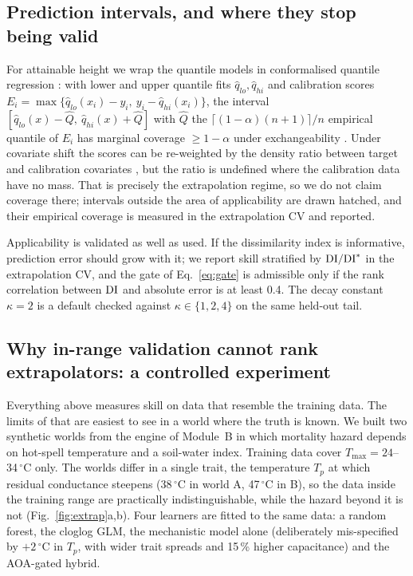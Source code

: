 \subsection{Prediction intervals, and where they stop being valid}
For attainable height we wrap the quantile models in conformalised quantile regression \citep{Romano2019}: with lower and upper quantile fits $\hat q_{lo},\hat q_{hi}$ and calibration scores $E_i=\max\{\hat q_{lo}(x_i)-y_i,\ y_i-\hat q_{hi}(x_i)\}$, the interval $[\hat q_{lo}(x)-\hat Q,\ \hat q_{hi}(x)+\hat Q]$ with $\hat Q$ the $\lceil(1-\alpha)(n+1)\rceil/n$ empirical quantile of $E_i$ has marginal coverage $\ge1-\alpha$ under exchangeability \citep{Angelopoulos2023}. Under covariate shift the scores can be re-weighted by the density ratio between target and calibration covariates \citep{Tibshirani2019}, but the ratio is undefined where the calibration data have no mass. That is precisely the extrapolation regime, so we do not claim coverage there; intervals outside the area of applicability are drawn hatched, and their empirical coverage is measured in the extrapolation CV and reported.

Applicability is validated as well as used. If the dissimilarity index is informative, prediction error should grow with it; we report skill stratified by $\mathrm{DI}/\mathrm{DI}^\ast$ in the extrapolation CV, and the gate of Eq.~\eqref{eq:gate} is admissible only if the rank correlation between $\mathrm{DI}$ and absolute error is at least 0.4. The decay constant $\kappa=2$ is a default checked against $\kappa\in\{1,2,4\}$ on the same held-out tail.

\subsection{Why in-range validation cannot rank extrapolators: a controlled experiment}
Everything above measures skill on data that resemble the training data. The limits of that are easiest to see in a world where the truth is known. We built two synthetic worlds from the engine of Module~B in which mortality hazard depends on hot-spell temperature and a soil-water index. Training data cover $T_{\max}=24$--34\,$^\circ$C only. The worlds differ in a single trait, the temperature $T_p$ at which residual conductance steepens (38\,$^\circ$C in world A, 47\,$^\circ$C in B), so the data inside the training range are practically indistinguishable, while the hazard beyond it is not (Fig.~\ref{fig:extrap}a,b). Four learners are fitted to the same data: a random forest, the cloglog GLM, the mechanistic model alone (deliberately mis-specified by $+2$\,$^\circ$C in $T_p$, with wider trait spreads and 15\,\% higher capacitance) and the AOA-gated hybrid.

